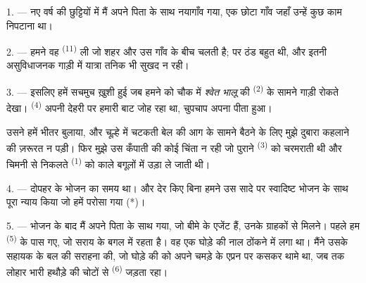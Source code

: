 

\VUsaut{4.0mm}
\VUsaut{3.0mm}
\VUfilet{16mm}
\VUsaut{5.6mm}
\VUsaut{3.0mm}

\VUsaut{3.0mm}

\VUsaut{4.0mm}

1. --- नए वर्ष की छुट्टियों में मैं अपने पिता के साथ नयागाँव गया, एक छोटा गाँव
जहाँ उन्हें कुछ काम निपटाना था।

2. --- हमने वह  \textsuperscript{(11)} ली जो शहर और उस गाँव के
बीच चलती है; पर ठंड बहुत थी, और इतनी असुविधाजनक गाड़ी में यात्रा तनिक भी सुखद न
रही।

3. --- इसलिए हमें सचमुच ख़ुशी हुई जब हमने  को चौक में
\textit{श्वेत भालू} की  \textsuperscript{(2)} के सामने गाड़ी रोकते
देखा।  \textsuperscript{(4)} अपनी देहरी पर हमारी बाट जोह रहा था,
चुपचाप अपना  पीता हुआ।

उसने हमें भीतर बुलाया, और चूल्हे में चटकती बेल की आग के सामने बैठने के लिए मुझे
दुबारा कहलाने की ज़रूरत न पड़ी। फिर मुझे उस कँपाती  की कोई
चिंता न रही जो पुराने  \textsuperscript{(3)} को चरमराती थी और चिमनी
से निकलते  \textsuperscript{(1)} को काले बगूलों में उड़ा ले जाती थी।

4. --- दोपहर के भोजन का समय था। और देर किए बिना हमने उस सादे पर स्वादिष्ट भोजन
के साथ पूरा न्याय किया जो हमें परोसा गया (*)।

\VUsaut{3.0mm}

5. --- भोजन के बाद मैं अपने पिता के साथ गया, जो बीमे के एजेंट हैं, उनके
ग्राहकों से मिलने। पहले हम  \textsuperscript{(5)} के पास गए, जो
सराय के बगल में रहता है। वह एक घोड़े की नाल ठोंकने में लगा था। मैंने उसके
सहायक के बल की सराहना की, जो घोड़े की  को अपने चमड़े के एप्रन पर
कसकर थामे था, जब तक लोहार भारी हथौड़े की चोटों से 
\textsuperscript{(6)} जड़ता रहा।

